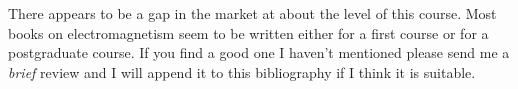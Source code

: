\documentclass{notes}
\begin{document}
\begin{center}
\end{center}

There appears to be a gap in the market at about the level of this
course.  Most books on electromagnetism seem to be written either for
a first course or for a postgraduate course.  If you find a good one I
haven't mentioned please send me a \emph{brief} review and I will
append it to this bibliography if I think it is suitable.
\end{document}
